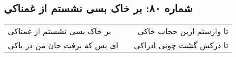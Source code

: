 \begin{center}
\section*{شماره ۸۰: بر خاک بسی نشستم از غمناکی}
\label{sec:080}
\begin{longtable}{l p{0.5cm} r}
بر خاک بسی نشستم از غمناکی
&&
تا وارستم ازین حجاب خاکی
\\
ای بس که برفت جان من در پاکی
&&
تا درکش گشت چونی ادراکی
\\
\end{longtable}
\end{center}
